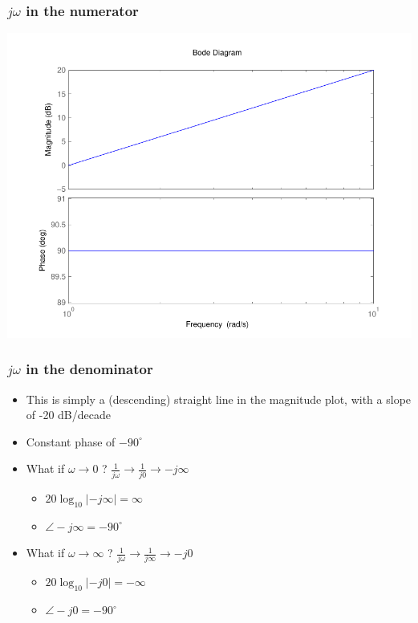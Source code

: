\begin{frame}
\frametitle{$j\omega$ in the numerator}

\begin{center}
\includegraphics[scale=0.5]{BodeZeroNum}
\end{center}

\end{frame}

\begin{frame}
\frametitle{$j\omega$ in the denominator}

\begin{itemize}
\item This is simply a (descending) straight line in the magnitude plot, with a slope of -20 dB/decade
\item Constant phase of $-90^{\circ}$
\end{itemize}

\begin{itemize}
\item What if $\omega \rightarrow 0$ ? \quad $\frac{1}{j\omega} \rightarrow \frac{1}{j0} \rightarrow -j\infty$
\begin{itemize}
\item $20\log_{10}|-j\infty| = \infty$
\item $\angle -j\infty = -90^{\circ}$
\end{itemize}

\item What if $\omega \rightarrow \infty$ ?  \quad  $\frac{1}{j\omega} \rightarrow \frac{1}{j\infty} \rightarrow -j0$
\begin{itemize}
\item $20\log_{10}|-j0| = -\infty$
\item $\angle -j0 = -90^{\circ}$
\end{itemize}
\end{itemize}

\end{frame}

